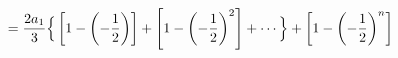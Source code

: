 \documentclass[preview]{standalone}
\begin{document}
\begin{align*}
\special{dvisvgm:raw <g id='unique000'>}=\frac{2a_1}{3}\Big\{\left[1-\left(-\frac{1}{2}\right)\right]+\left[1-\left(-\frac{1}{2}\right)^2\right]+\cdots\Big\} \special{dvisvgm:raw </g>}\special{dvisvgm:raw <g id='unique001'>}+\left[1-\left(-\frac{1}{2}\right)^n\right]\special{dvisvgm:raw </g>}
\end{align*}
\end{document}
